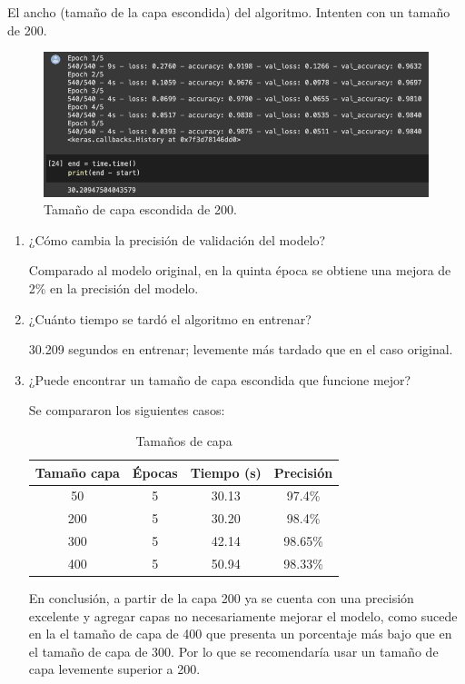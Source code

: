 \begin{problema}
	El ancho (tamaño de la capa escondida) del algoritmo. Intenten con un tamaño de 200.  
	\begin{figure}[H]
		\centering
		\includegraphics[scale=0.5]{Images/2.png}
		\caption{Tamaño de capa escondida de 200.}
	\end{figure}
	\begin{enumerate}
		\item ¿Cómo cambia la precisión de validación del modelo? 
			\begin{sol}
			Comparado al modelo original, en la quinta época se obtiene una mejora de 2\% en la precisión del modelo. 
		\end{sol}
		\item ¿Cuánto tiempo se tardó el algoritmo en entrenar?
			\begin{sol}
			30.209 segundos en entrenar; levemente más tardado que en el caso original. 
		\end{sol}
		\item ¿Puede encontrar un tamaño de capa escondida que funcione mejor?
			\begin{sol}
			Se compararon los siguientes casos: 
			\begin{table}[H]
				\centering
				\label{tab:comparacion}
				\begin{tabular}{@{}cccc@{}}
					\toprule
					\textbf{Tamaño capa} & \textbf{Épocas} & \textbf{Tiempo (s)} & \textbf{Precisión} \\ \midrule
					50                   & 5               & 30.13               & 97.4\%             \\
					200                  & 5               & 30.20               & 98.4\%             \\
					300                  & 5               & 42.14               & 98.65\%            \\
					400                  & 5               & 50.94               & 98.33\%            \\ \bottomrule
				\end{tabular}
			\caption{Tamaños de capa}
			\end{table}
		En conclusión, a partir de la capa 200 ya se cuenta con una precisión excelente y agregar capas no necesariamente mejorar el modelo, como sucede en la el tamaño de capa de 400 que presenta un porcentaje más bajo que en el tamaño de capa de 300. Por lo que se recomendaría usar un tamaño de capa levemente superior a 200. 
		\end{sol}
	\end{enumerate}
\end{problema}



